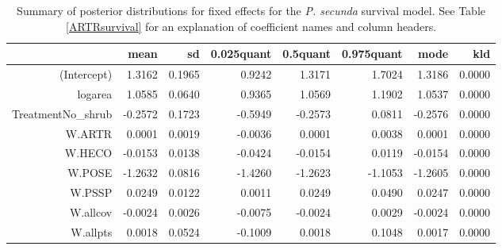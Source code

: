 \documentclass[11pt]{article}
\begin{document}
\begin{table}[ht]
\centering
\caption{Summary of posterior distributions for fixed effects for the \textit{P. secunda} survival model. See Table \ref{ARTRsurvival} for an explanation of coefficient names
and column headers.} 
\label{POSEsurvival}
\begin{tabular}{rrrrrrrr}
  \hline
 & mean & sd & 0.025quant & 0.5quant & 0.975quant & mode & kld \\ 
  \hline
(Intercept) & 1.3162 & 0.1965 & 0.9242 & 1.3171 & 1.7024 & 1.3186 & 0.0000 \\ 
  logarea & 1.0585 & 0.0640 & 0.9365 & 1.0569 & 1.1902 & 1.0537 & 0.0000 \\ 
  TreatmentNo\_shrub & -0.2572 & 0.1723 & -0.5949 & -0.2573 & 0.0811 & -0.2576 & 0.0000 \\ 
  W.ARTR & 0.0001 & 0.0019 & -0.0036 & 0.0001 & 0.0038 & 0.0001 & 0.0000 \\ 
  W.HECO & -0.0153 & 0.0138 & -0.0424 & -0.0154 & 0.0119 & -0.0154 & 0.0000 \\ 
  W.POSE & -1.2632 & 0.0816 & -1.4260 & -1.2623 & -1.1053 & -1.2605 & 0.0000 \\ 
  W.PSSP & 0.0249 & 0.0122 & 0.0011 & 0.0249 & 0.0490 & 0.0247 & 0.0000 \\ 
  W.allcov & -0.0024 & 0.0026 & -0.0075 & -0.0024 & 0.0029 & -0.0024 & 0.0000 \\ 
  W.allpts & 0.0018 & 0.0524 & -0.1009 & 0.0018 & 0.1048 & 0.0017 & 0.0000 \\ 
   \hline
\end{tabular}
\end{table}
\end{document}
